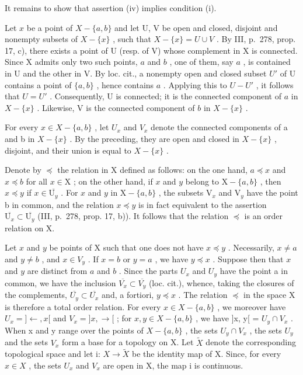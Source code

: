 It remains to show that assertion (iv) implies condition (i).

Let \(x\) be a point of \(X - \{a, b\}\) and let U, V be open and closed, disjoint and nonempty subsets of \(X - \{x\}\) , such that \(X - \{x\} = U \cup V\) . By III, p.~278, prop. 17, c), there exists a point of U (resp. of V) whose complement in X is connected. Since X admits only two such points, \(a\) and \(b\) , one of them, say \(a\) , is contained in U and the other in V. By loc. cit., a nonempty open and closed subset \(U'\) of U contains a point of \(\{a, b\}\) , hence contains \(a\) . Applying this to \(U - U'\) , it follows that \(U = U'\) . Consequently, U is connected; it is the connected component of \(a\) in \(X - \{x\}\) . Likewise, V is the connected component of \(b\) in \(X - \{x\}\) .

For every \(x \in X - \{a, b\}\) , let \(U_x\) and \(V_x\) denote the connected components of a and b in \(X - \{x\}\) . By the preceding, they are open and closed in \(X - \{x\}\) , disjoint, and their union is equal to \(X - \{x\}\) .

Denote by \(\preccurlyeq\) the relation in X defined as follows: on the one hand, \(a \preccurlyeq x\) and \(x \preccurlyeq b\) for all \(x \in \mathrm{X}\) ; on the other hand, if \(x\) and \(y\) belong to \(\mathrm{X} - \{a, b\}\) , then \(x \preccurlyeq y\) if \(x \in \overline{\mathrm{U}_y}\) . For \(x\) and \(y\) in \(\mathrm{X} - \{a, b\}\) , the subsets \(\mathrm{V}_x\) and \(\mathrm{V}_y\) have the point b in common, and the relation \(x \preccurlyeq y\) is in fact equivalent to the assertion \(\overline{\mathrm{U}_x} \subset \overline{\mathrm{U}_y}\) (III, p.~278, prop. 17, b)). It follows that the relation \(\preccurlyeq\) is an order relation on X.

Let \(x\) and \(y\) be points of X such that one does not have \(x \preccurlyeq y\) . Necessarily, \(x \neq a\) and \(y \neq b\) , and \(x \in V_y\) . If \(x = b\) or \(y = a\) , we have \(y \preccurlyeq x\) . Suppose then that \(x\) and \(y\) are distinct from \(a\) and \(b\) . Since the parts \(U_x\) and \(U_y\) have the point a in common, we have the inclusion \(\overline{V_x} \subset \overline{V_y}\) (loc. cit.), whence, taking the closures of the complements, \(\overline{U_y} \subset \overline{U_x}\) and, a fortiori, \(y \preccurlyeq x\) . The relation \(\preccurlyeq\) in the space X is therefore a total order relation. For every \(x \in X - \{a, b\}\) , we moreover have \(U_x = ] \leftarrow, x[\) and \(V_x = ]x, \rightarrow[\) ; for \(x, y \in X - \{a, b\}\) , we have {]}x, y{[} = \(U_y \cap V_x\) . When x and y range over the points of \(X - \{a, b\}\) , the sets \(U_y \cap V_x\) , the sets \(U_y\) and the sets \(V_x\) form a base for a topology on X. Let \(\widetilde{X}\) denote the corresponding topological space and let i: \(X \to \widetilde{X}\) be the identity map of X. Since, for every \(x \in X\) , the sets \(U_x\) and \(V_x\) are open in X, the map i is continuous.


